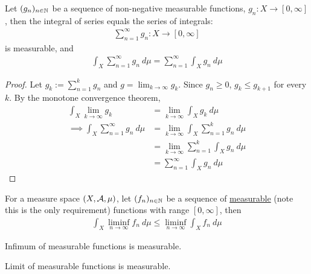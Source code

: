 \documentclass[11pt]{article}
\begin{document}
	\begin{corollary}
		Let $(g_n)_{n \in \mathbb{N}}$ be a sequence of non-negative measurable functions, $g_n: X \to [0, \infty]$, then the integral of series equals the series of integrals:
		\begin{align}
			\sum_{n=1}^\infty g_n: X \to [0, \infty]
		\end{align}
		is measurable, and
		\begin{align}
			\int_X \sum_{n=1}^\infty g_n\ d\mu = \sum_{n=1}^\infty \int_X g_n\ d\mu
		\end{align}
	\end{corollary}
	
	\begin{proof}
		Let $g_k := \sum_{n=1}^k g_n$ and $g = \lim_{k \to \infty} g_k$. Since $g_n \geq 0$, $g_k \leq g_{k+1}$ for every $k$. By the monotone convergence theorem,
		\begin{align}
			\int_X \lim_{k\to\infty} g_k &= \lim_{k\to \infty} \int_X g_k\ d\mu \\
			\implies \int_X \sum_{n=1}^\infty g_n\ d\mu &= \lim_{k \to \infty} \int_X \sum_{n=1}^k  g_n\ d\mu \\
			&= \lim_{k \to \infty} \sum_{n=1}^k \int_X g_n\ d\mu \\
			&= \sum_{n=1}^\infty \int_X g_n\ d\mu
		\end{align}
	\end{proof}

	\begin{lemma}\label{fatous}
		For a measure space $(X, \mathcal{{A}}, \mu)$, let $(f_n)_{n \in \mathbb{N}}$ be a sequence of \ul{measurable} (note this is the only requirement) functions with range $[0, \infty]$, then
		\begin{align}
			\int_X \liminf_{n \to \infty} f_n\ d\mu \leq \liminf_{n \to \infty} \int_X f_n\ d\mu
		\end{align}
	\end{lemma}

	\begin{proposition}
		Infimum of measurable functions is measurable.
	\end{proposition}
	
	\begin{proposition}
		Limit of measurable functions is measurable.
	\end{proposition}
	
\end{document}
